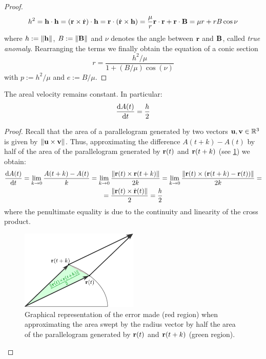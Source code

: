 \documentclass[../main.tex]{subfiles}
\begin{document}
\begin{proof}
  \begin{equation}
    h^2=\boldsymbol{\mathrm{h}}\cdot\boldsymbol{\mathrm{h}}=(\boldsymbol{\mathrm{r}}\times\dot{\boldsymbol{\mathrm{r}}})\cdot\boldsymbol{\mathrm{h}}=\boldsymbol{\mathrm{r}}\cdot(\dot{\boldsymbol{\mathrm{r}}}\times\boldsymbol{\mathrm{h}})=\frac{\mu}{r}\boldsymbol{\mathrm{r}}\cdot\boldsymbol{\mathrm{r}}+\boldsymbol{\mathrm{r}}\cdot\boldsymbol{\mathrm{B}}=\mu r+rB\cos\nu
  \end{equation}
  where $h:=\left\|\boldsymbol{\mathrm{h}}\right\|$, $B:=\left\|\boldsymbol{\mathrm{B}}\right\|$ and $\nu$ denotes the angle between $\boldsymbol{\mathrm{r}}$ and $\boldsymbol{\mathrm{B}}$, called \emph{true anomaly}. Rearranging the terms we finally obtain the equation of a conic section
  \begin{equation}
    r=\frac{h^2/\mu}{1+(B/\mu)\cos(\nu)}
  \end{equation}
  with $p:=h^2/\mu$ and $e:=B/\mu$.
\end{proof}
\begin{proposition}
  The areal velocity remains constant. In particular:
  \begin{equation}
    \dv{A(t)}{t}=\frac{h}{2}
  \end{equation}
\end{proposition}
\begin{proof}
  Recall that the area of a parallelogram generated by two vectors $\boldsymbol{\mathrm{u}},\boldsymbol{\mathrm{v}}\in\mathbb{R}^3$ is given by $\left\|\boldsymbol{\mathrm{u}}\times\boldsymbol{\mathrm{v}}\right\|$. Thus, approximating the difference $A(t+k)-A(t)$ by half of the area of the parallelogram generated by $\boldsymbol{\mathrm{r}}(t)$ and ${\boldsymbol{\mathrm{r}}}(t+k)$ (see \cref{fig:areal_vel}) we obtain:
  \begin{multline}
    \dv{A(t)}{t}=\lim_{k\to 0}\frac{A(t+k)-A(t)}{k}=\lim_{k\to 0}\frac{\left\|\boldsymbol{\mathrm{r}}(t)\times\boldsymbol{\mathrm{r}}(t+k)\right\|}{2k}=\lim_{k\to 0}\frac{\left\|\boldsymbol{\mathrm{r}}(t)\times(\boldsymbol{\mathrm{r}}(t+k)-\boldsymbol{\mathrm{r}}(t))\right\|}{2k}=\\
    =\frac{\left\|\boldsymbol{\mathrm{r}}(t)\times\dot{\boldsymbol{\mathrm{r}}}(t)\right\|}{2}=\frac{h}{2}
  \end{multline}
  where the penultimate equality is due to the continuity and linearity of the cross product.
  \begin{figure}[htbp]
    \centering
    \includegraphics[width=0.5\textwidth]{Images/areal_velocity.pdf}
    \caption{Graphical representation of the error made (red region) when approximating the area swept by the radius vector by half the area of the parallelogram generated by $\boldsymbol{\mathrm{r}}(t)$ and $\boldsymbol{\mathrm{r}}(t+k)$ (green region).}
    \label{fig:areal_vel}
  \end{figure}
\end{proof}
\end{document}
